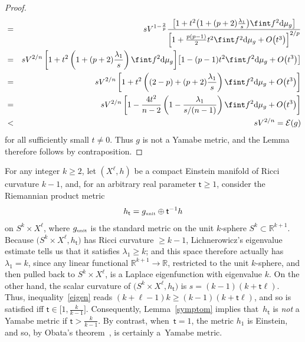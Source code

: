 \documentclass[pdftex]{sigma}
\numberwithin{equation}{section}
\def\RR{\mathbb{R}}
\begin{document}
\begin{proof}
\begin{eqnarray*}
&=&sV^{1-\frac{2}{p}} \frac{\left[ 1+ t^2 \big(1+ (p+2)\frac{\lambda_1}{s} \big)\fint f^2 {\rm d}\mu_g\right] }{\left[ 1+ \frac{p(p-1)}{2} t^2\fint f^2 {\rm d}\mu_g +O\big(t^3\big) \right]^{2/p}} \\
&=&sV^{2/n} \left[ 1+ t^2 \left(1+ (p+2)\frac{\lambda_1}{s} \right)\fint f^2 {\rm d}\mu_g\right] }{\left[ 1- (p-1) t^2\fint f^2 {\rm d}\mu_g +O\big(t^3\big) \right] \\
&=&sV^{2/n} \left[ 1+ t^2 \left((2-p)+ (p+2)\frac{\lambda_1}{s} \right)\fint f^2 {\rm d}\mu_g +O\big(t^3\big)\right] \\
&=&sV^{2/n} \left[ 1-\frac{4t^2}{n-2} \left(1- \frac{\lambda_1}{s/(n-1)} \right)\fint f^2 {\rm d}\mu_g +O\big(t^3\big)\right] \\
&<&sV^{2/n}= \mathcal{E}(g)
\end{eqnarray*}
for all sufficiently small $t \neq 0$. Thus $g$ is not a Yamabe metric, and the Lemma therefore follows by contraposition.
\end{proof}

\begin{Example}\label{zamp}
For any integer $k\geq 2$, let $(X^\ell , h)$ be a compact Einstein manifold of Ricci curvature $k-1$, and,
for an arbitrary real parameter
$\mathsf{t} \geq 1$, consider the Riemannian product metric
\begin{equation}
\label{squeeze}
h_{\mathsf{t}}= g_{\text{\tiny unit}} \oplus \mathsf{t}^{-1} h
\end{equation}
 on $S^k \times X^\ell$, where $g_{\text{\tiny unit}}$ is the standard metric on the unit $k$-sphere $S^k \subset \RR^{k+1}$.
 Because $\big(S^k \times X^\ell, h_{\mathsf{t}}\big)$ has Ricci curvature $\geq k-1$,
 Lichnerowicz's eigenvalue estimate \cite{lichnebook} tells us that it satisfies $\lambda_1 \geq k$; and
 this space therefore actually has $\lambda_1 =k$,
 since any linear functional $\RR^{k+1}\to \RR$,
 restricted to the unit $k$-sphere, and then pulled back to $S^k\times X^\ell$, is a Laplace eigenfunction
 with eigenvalue $k$. On the other hand, the scalar curvature
of $\big(S^k \times X^\ell, h_{\mathsf{t}}\big)$ is $s= (k-1) (k+\mathsf{t}\ell)$.
Thus, inequality~\eqref{eigen} reads $(k+\ell -1) k \geq (k-1) (k+\mathsf{t}\ell)$, and so is
 satisfied iff
$\mathsf{t}\in \big[1,\frac{k}{k-1}\big]$. Consequently, Lemma~\ref{symptom} implies that~$h_{\mathsf{t}}$ is {\em not}
 a Yamabe metric if $\mathsf{t}> \frac{k}{k-1}$. By contrast, when~$\mathsf{t}=1$,
the metric $h_1$ is Einstein, and so, by Obata's theorem~\cite{obata}, is certainly a~Yamabe metric.
\end{Example}
\end{document}
